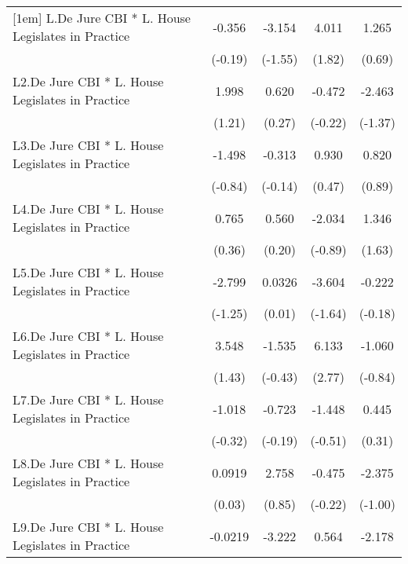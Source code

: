 {\begin{longtable}{l*{4}{c}}
[1em]
L.De Jure CBI * L. House Legislates in Practice&   -0.356         &   -3.154         &    4.011         &    1.265         \\
                &  (-0.19)         &  (-1.55)         &   (1.82)         &   (0.69)         \\
[1em]
L2.De Jure CBI * L. House Legislates in Practice&    1.998         &    0.620         &   -0.472         &   -2.463         \\
                &   (1.21)         &   (0.27)         &  (-0.22)         &  (-1.37)         \\
[1em]
L3.De Jure CBI * L. House Legislates in Practice&   -1.498         &   -0.313         &    0.930         &    0.820         \\
                &  (-0.84)         &  (-0.14)         &   (0.47)         &   (0.89)         \\
[1em]
L4.De Jure CBI * L. House Legislates in Practice&    0.765         &    0.560         &   -2.034         &    1.346         \\
                &   (0.36)         &   (0.20)         &  (-0.89)         &   (1.63)         \\
[1em]
L5.De Jure CBI * L. House Legislates in Practice&   -2.799         &   0.0326         &   -3.604         &   -0.222         \\
                &  (-1.25)         &   (0.01)         &  (-1.64)         &  (-0.18)         \\
[1em]
L6.De Jure CBI * L. House Legislates in Practice&    3.548         &   -1.535         &    6.133\sym{**} &   -1.060         \\
                &   (1.43)         &  (-0.43)         &   (2.77)         &  (-0.84)         \\
[1em]
L7.De Jure CBI * L. House Legislates in Practice&   -1.018         &   -0.723         &   -1.448         &    0.445         \\
                &  (-0.32)         &  (-0.19)         &  (-0.51)         &   (0.31)         \\
[1em]
L8.De Jure CBI * L. House Legislates in Practice&   0.0919         &    2.758         &   -0.475         &   -2.375         \\
                &   (0.03)         &   (0.85)         &  (-0.22)         &  (-1.00)         \\
[1em]
L9.De Jure CBI * L. House Legislates in Practice&  -0.0219         &   -3.222         &    0.564         &   -2.178         \\

\end{longtable}}
